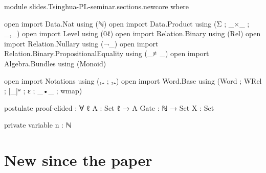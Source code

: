 \begin{code}[hide]
module slides.Tsinghua-PL-seminar.sections.newcore where

open import Data.Nat using (ℕ)
open import Data.Product using (Σ ; _×_ ; _,_)
open import Level using (0ℓ)
open import Relation.Binary using (Rel)
open import Relation.Nullary using (¬_)
open import Relation.Binary.PropositionalEquality using (_≢_)
open import Algebra.Bundles using (Monoid)

open import Notations using (₁₊ ; ₂₊)
open import Word.Base using (Word ; WRel ; [_]ʷ ; ε ; _•_ ; wmap)

postulate
  proof-elided : ∀ {ℓ} {A : Set ℓ} → A
  Gate : ℕ → Set
  X : Set

private variable
  n : ℕ
\end{code}
\NewPart
\section{New since the paper}

